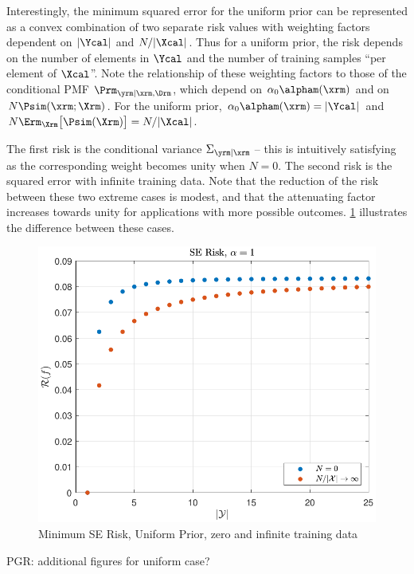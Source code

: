 \documentclass[12pt]{report}
\begin{document}
Interestingly, the minimum squared error for the uniform prior can be represented as a convex combination of two separate risk values with weighting factors dependent on $|\Ycal|$ and $N/|\Xcal|$. Thus for a uniform prior, the risk depends on the number of elements in $\Ycal$ and the number of training samples ``per element of $\Xcal$''. Note the relationship of these weighting factors to those of the conditional PMF $\Prm_{\yrm | \xrm,\Drm}$, which depend on $\alpha_0 \alpham(\xrm)$ and on $N \Psim(\xrm;\Xrm)$. For the uniform prior, $\alpha_0 \alpham(\xrm) = |\Ycal|$ and $N \Erm_{\Xrm}\big[ \Psim(\Xrm) \big] = N/|\Xcal|$.

The first risk is the conditional variance $\Sigma_{\yrm|\xrm}$ -- this is intuitively satisfying as the corresponding weight becomes unity when $N=0$. The second risk is the squared error with infinite training data. Note that the reduction of the risk between these two extreme cases is modest, and that the attenuating factor increases towards unity for applications with more possible outcomes. \cref{fig:Risk_SE_uniform_N_lim} illustrates the difference between these cases.

\begin{figure}
\centering
\includegraphics[width=0.7\linewidth]{Risk_SE_uniform_N_lim.pdf}
\caption{Minimum SE Risk, Uniform Prior, zero and infinite training data}
\label{fig:Risk_SE_uniform_N_lim}
\end{figure}


PGR: additional figures for uniform case?

%
%
\end{document}
